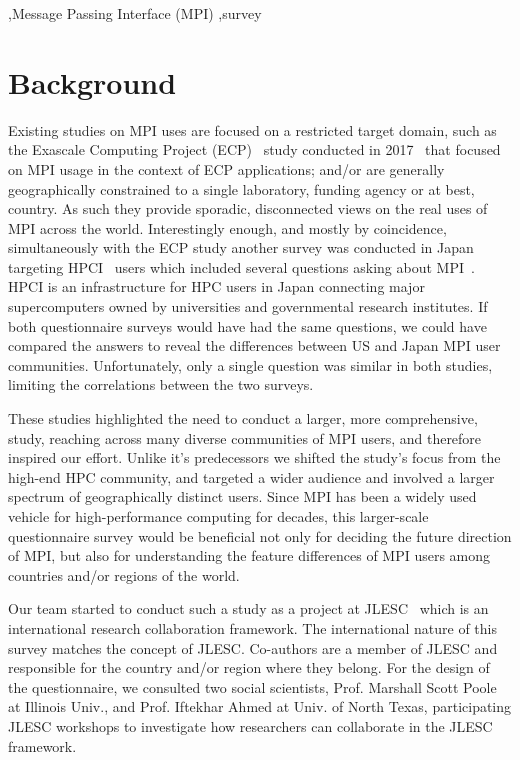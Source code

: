 \documentclass[preprint,5p,times]{elsarticle}
\newcommand{\revision}[2]{{\color{blue}#2}}
\begin{document}
\begin{keyword}
   \sep Message Passing Interface (MPI) \sep survey
\end{keyword}

\maketitle

\section{Background}

Existing studies on MPI uses are focused on a restricted target
domain, such as the Exascale Computing Project (ECP)~\cite{ECP} study
conducted in 2017~\cite{ECP-survey} that focused
on MPI usage in the
context of ECP applications; and/or are generally geographically
constrained to a single laboratory, funding agency or at best,
country. As such they provide sporadic, disconnected views on the real
uses of MPI across the world.
%
Interestingly enough, and mostly by coincidence, simultaneously with
the ECP study another survey was conducted in Japan targeting
HPCI~\cite{HPCI} users which included several questions asking about
MPI~\cite{hpci-user-survey}.  HPCI is an infrastructure for HPC users
in Japan connecting major supercomputers owned by universities and
governmental research institutes. If both questionnaire surveys would
have \revision{}{had} the same questions, we could have compared the answers to reveal
the differences between US and Japan MPI user
communities. Unfortunately, \revision{}{only} a single question was similar in both
studies, limiting the correlations between the two surveys.

These studies highlighted the need to conduct a larger, more comprehensive,
study, reaching across many diverse \revision{community}{communities} of MPI users, and therefore
inspired our effort. Unlike it's predecessors we shifted the study's focus from
the high-end HPC community, and targeted a wider audience and involved a larger
spectrum of geographically distinct users. Since MPI has been a widely used
vehicle for high-performance computing for decades, this larger-scale
questionnaire survey would be beneficial not only for deciding the future
direction of MPI, but also for understanding the feature differences of MPI
users among countries and/or regions of the world.

Our team started to conduct such a study as a project at
JLESC~\cite{JLESC} which is an international research collaboration
framework. The international nature of this survey matches the concept
of JLESC. Co-authors are a member of JLESC and responsible for the
country and/or region where they belong. For the design of the questionnaire,
we consulted two social scientists, Prof. Marshall Scott Poole at
Illinois Univ., and Prof. Iftekhar Ahmed at Univ. of North Texas,
participating JLESC workshops to investigate how researchers can
collaborate in the JLESC framework.
\end{document}
